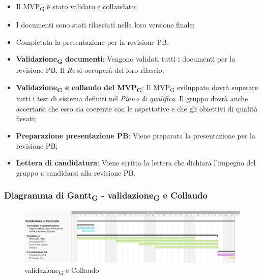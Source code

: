 \:
\begin{itemize}
	\item Il MVP\textsubscript{G} è stato validato e collaudato;
	\item I documenti sono stati rilasciati nella loro versione finale;
	\item Completata la presentazione per la revisione PB.
\end{itemize}

\:
\begin{itemize}
	\item \textbf{Validazione\textsubscript{G} documenti}: Vengono validati tutti i documenti per la revisione PB. Il \textit{Re} si occuperà del loro rilascio;
	\item \textbf{Validazione\textsubscript{G} e collaudo del MVP\textsubscript{G}}: Il MVP\textsubscript{G} sviluppato dovrà superare tutti i test di sistema definiti nel \textit{Piano di qualifica}. Il gruppo dovrà anche accertarsi che esso sia coerente con le aspettative e che gli obiettivi di qualità fissati;
	\item \textbf{Preparazione presentazione PB}: Viene preparata la presentazione per la revisione PB;
	\item \textbf{Lettera di candidatura}: Viene scritta la lettera che dichiara l'impegno del gruppo a candidarsi alla revisione PB.
\end{itemize}

\subsubsection{Diagramma di Gantt\textsubscript{G} - validazione\textsubscript{G} e Collaudo}

\begin{figure}[H]
\centering
\includegraphics[width=\textwidth]{img/4_collaudo.png}
\caption{validazione\textsubscript{G} e Collaudo}
\end{figure}

